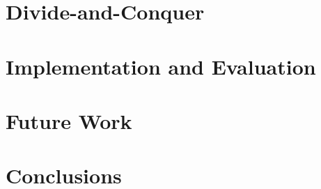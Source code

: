 \documentclass[sigconf, screen, natbib=false, dvipsnames, table]{acmart}
\theoremstyle{definition}
\begin{document}

\section{Divide-and-Conquer}
\label{sec:div_and_conq}


\section{Implementation and Evaluation}
\label{sec:implementation}


\section{Future Work}
\label{sec:implementation_and_benchmarks}
%
%

\section{Conclusions}
\label{sec:conclusion}
%


\printbibliography

\end{document}
